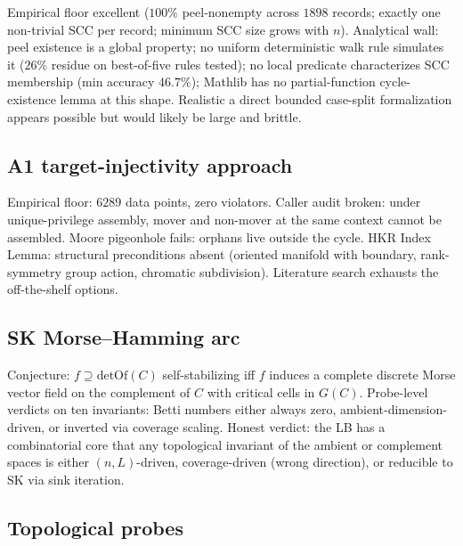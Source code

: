 \documentclass[11pt,a4paper]{article}
\theoremstyle{plain}
\theoremstyle{definition}
\newcommand{\SK}{\mathrm{SK}}
\newcommand{\detOf}{\mathrm{detOf}}
\begin{document}
Empirical floor excellent ($100\%$ peel-nonempty across $1898$
records; exactly one non-trivial SCC per record; minimum SCC size
grows with $n$).  Analytical wall: peel existence is a global
property; no uniform deterministic walk rule simulates it
($26\%$ residue on best-of-five rules tested); no local predicate
characterizes SCC membership (min accuracy $46.7\%$); Mathlib has no
partial-function cycle-existence lemma at this shape.  Realistic
a direct bounded case-split formalization appears possible but
would likely be large and brittle.

\subsection{A1 target-injectivity approach}\label{app:lndsc-a1}

Empirical floor: $6289$ data points, zero violators.  Caller audit
broken: under unique-privilege assembly, mover and non-mover at the
same context cannot be assembled.  Moore pigeonhole fails: orphans
live outside the cycle.  HKR Index Lemma: structural preconditions
absent (oriented manifold with boundary, rank-symmetry group action,
chromatic subdivision).  Literature search exhausts the off-the-shelf
options.

\subsection{SK Morse--Hamming arc}\label{app:lndsc-skmh}

Conjecture: $f \supseteq \detOf(C)$ self-stabilizing iff $f$ induces a
complete discrete Morse vector field on the complement of $C$ with
critical cells in $G(C)$.  Probe-level verdicts on ten invariants:
Betti numbers either always zero, ambient-dimension-driven, or
inverted via coverage scaling.  Honest verdict: the LB has a
combinatorial core that any topological invariant of the ambient or
complement spaces is either $(n, L)$-driven, coverage-driven (wrong
direction), or reducible to $\SK$ via sink iteration.

\subsection{Topological probes}\label{app:lndsc-topo}
\end{document}
